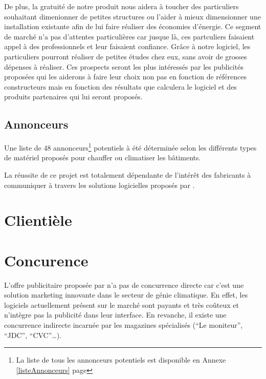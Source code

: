 		De plus, la gratuité de notre produit nous aidera à toucher des particuliers souhaitant
		dimenionner de petites structures ou l'aider à mieux dimensionner une installation existante
		afin de lui faire réaliser des économies d'énergie. Ce segment de marché n'a pas d'attentes particulières
		car jusque là, ces partculiers faisaient appel à des professionnels et leur faisaient confiance. Grâce à notre
		logiciel, les particuliers pourront réaliser de petites études chez eux, sans avoir de grosses dépenses
		à réaliser. Ces prospects seront les plus intéressés par les publicités proposées qui les aiderons
		à faire leur choix non pas en fonction de références constructeurs mais en fonction des résultats que calculera le
		logiciel et des produits partenaires qui lui seront proposés.

		\subsection{Annonceurs}
			Une liste de 48 annonceurs\footnote{La liste de tous les annonceurs potentiels est disponible en Annexe \ref{listeAnnonceurs} page \pageref{listeAnnonceurs}}  
			potentiels à été déterminée selon les différents types de matériel proposés 
			pour chauffer ou climatiser les bâtiments.

			La réussite de ce projet est totalement dépendante de l'intérêt des fabricants à communiquer à travers les solutions logicielles proposés par \K{}.
		
	\section{Clienti\`ele}

	
	\section{Concurence}\label{concurence}
	L'offre publicitaire proposée par \K{} n'a pas de concurrence directe
	car c'est une solution marketing innovante dans le secteur de génie
	climatique. En effet, les logiciels actuellement
	présent sur le marché sont payants et très coûteux et n'intègre pas la
	publicité dans leur interface.
	En revanche, il existe une concurrence indirecte incarnée par les
	magazines spécialisés (``Le moniteur'', ``JDC'', ``CVC''\ldots).

